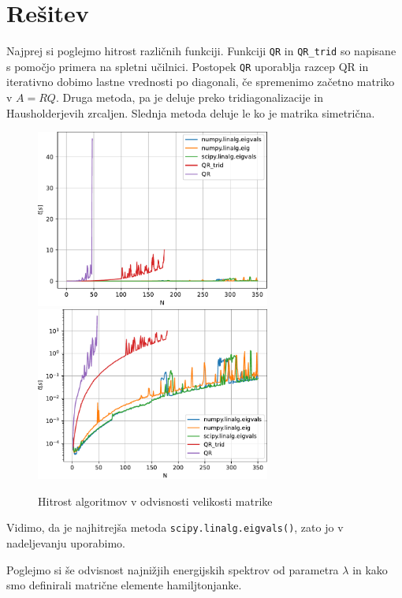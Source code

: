 \section{Rešitev}
Najprej si poglejmo hitrost različnih funkciji. Funkciji \verb|QR| in \verb|QR_trid|
so napisane s pomočjo primera na spletni učilnici. Postopek \verb|QR| uporablja
razcep QR in iterativno dobimo lastne vrednosti po diagonali, če spremenimo začetno matriko v $A=RQ$.
Druga metoda, pa je deluje preko tridiagonalizacije in Hausholderjevih zrcaljen. Slednja metoda
deluje le ko je matrika simetrična.

\begin{figure}[h]
    \centering
    \includegraphics[width=77mm]{pdfs/t(N).pdf}
    \includegraphics[width=77mm]{pdfs/t(N)log.pdf}
    \caption{Hitrost algoritmov v odvisnosti velikosti matrike}
\end{figure}

Vidimo, da je najhitrejša metoda \verb|scipy.linalg.eigvals()|, zato jo
v nadeljevanju uporabimo.

Poglejmo si še odvisnost najnižjih energijskih spektrov od
parametra $\lambda$ in kako smo definirali matrične elemente
hamiljtonjanke.

